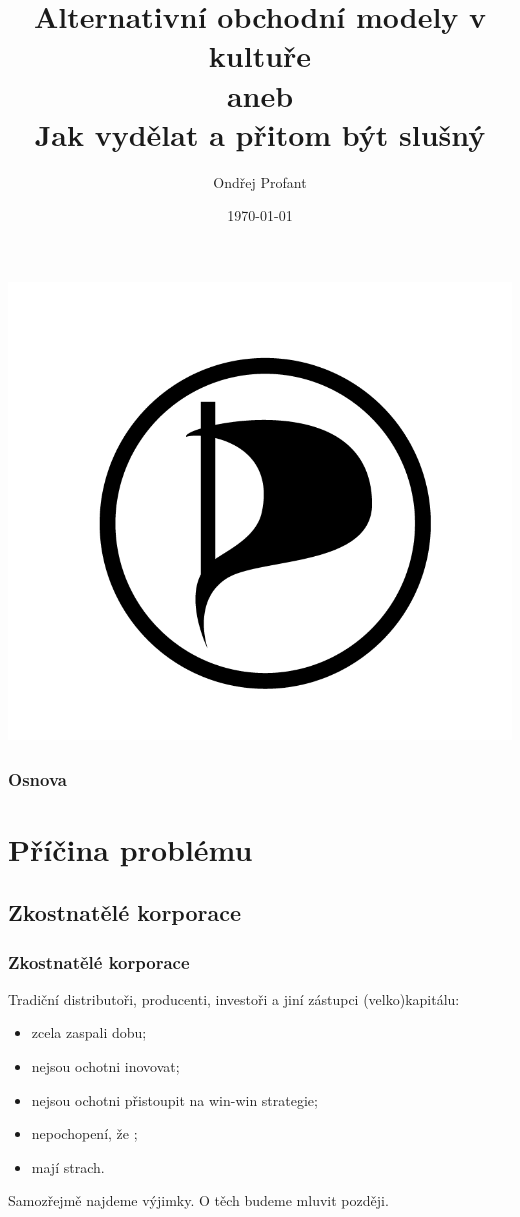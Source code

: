 \documentclass[xetex]{beamer}
\title{Alternativní obchodní modely v kultuře\\
aneb\\
Jak vydělat a přitom být slušný}
\author{Ondřej Profant}
\institute[Piráti]{Česká pirátská strana}
\date{\today}
\begin{document}
\begin{frame}
  \titlepage
  \includegraphics[scale=0.4]{plachta_s_okrajem.png}
\end{frame}

\begin{frame}
  \frametitle{Osnova}
  \tableofcontents
\end{frame}

\section{Příčina problému}

\subsection{Zkostnatělé korporace}
\begin{frame}
 \frametitle{Zkostnatělé korporace}
Tradiční distributoři, producenti, investoři a jiní zástupci (velko)kapitálu:
 \begin{itemize}
  \item zcela zaspali dobu;
  \item nejsou ochotni inovovat;
  \item nejsou ochotni přistoupit na win-win strategie;
  \item nepochopení, že ;
  \item mají strach.
 \end{itemize}

Samozřejmě najdeme výjimky. O těch budeme mluvit později.
\end{frame}
\end{document}
